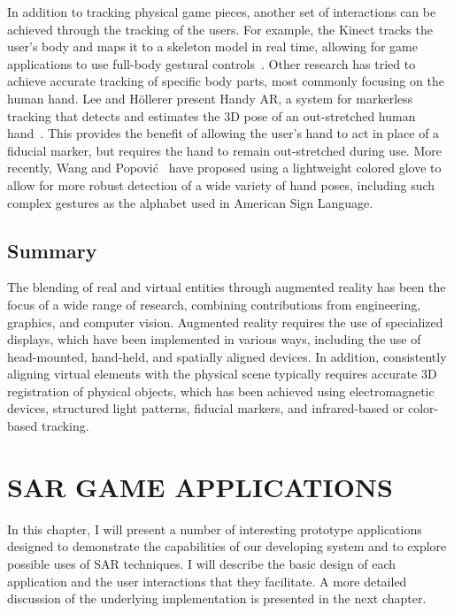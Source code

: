 \documentclass{thesis}
\begin{document}
In addition to tracking physical game pieces, another set of interactions can be achieved through the tracking of the users. 
For example, the Kinect tracks the user's body and maps it to a skeleton model in real time, allowing for game applications to use full-body gestural controls~\cite{Shotton2011, Kinect}. Other research has tried to achieve accurate tracking of specific body parts, most commonly focusing on the human hand. Lee and H\"{o}llerer present Handy AR, a system for markerless tracking that detects and estimates the 3D pose of an out-stretched human hand~\cite{LeeT2007}. This provides the benefit of allowing the user's hand to act in place of a fiducial marker, but requires the hand to remain out-stretched during use. More recently, Wang and Popovi\'c~\cite{Wang2009} have proposed using a lightweight colored glove to allow for more robust detection of a wide variety of hand poses, including such complex gestures as the alphabet used in American Sign Language.

\section{Summary}

The blending of real and virtual entities through augmented reality has been the focus of a wide range of research, combining contributions from engineering, graphics, and computer vision. Augmented reality requires the use of specialized displays, which have been implemented in various ways, including the use of head-mounted, hand-held, and spatially aligned devices. In addition, consistently aligning virtual elements with the physical scene typically requires accurate 3D registration of physical objects, which has been achieved using electromagnetic devices, structured light patterns, fiducial markers, and infrared-based or color-based tracking.

\chapter{SAR GAME APPLICATIONS}

In this chapter, I will present a number of interesting prototype applications designed to demonstrate the capabilities of our developing system and to explore possible uses of SAR techniques. I will describe the basic design of each application and the user interactions that they facilitate. A more detailed discussion of the underlying implementation is presented in the next chapter.
\end{document}
